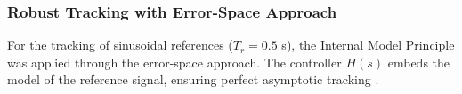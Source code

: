 \subsubsection{Robust Tracking with Error-Space Approach}
For the tracking of sinusoidal references ($T_r = 0.5$ s), the Internal Model Principle was applied through the error-space approach. The controller $H(s)$ embeds the model of the reference signal, ensuring perfect asymptotic tracking .